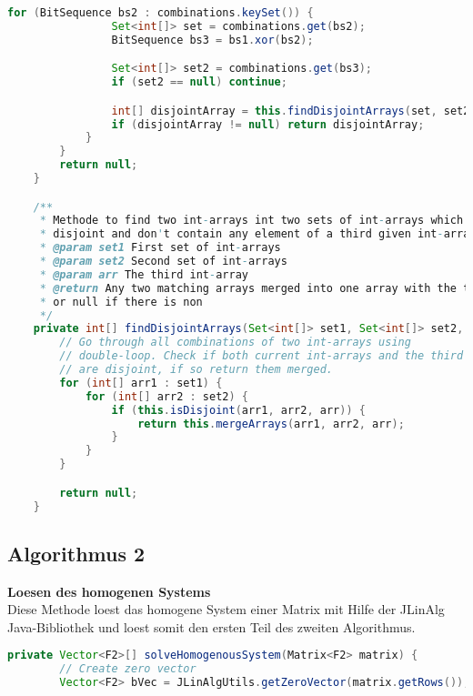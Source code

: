\documentclass[a4paper,10pt,ngerman]{scrartcl}
\begin{document}
{\begin{lstlisting}[language=Java]
            for (BitSequence bs2 : combinations.keySet()) {
                Set<int[]> set = combinations.get(bs2);
                BitSequence bs3 = bs1.xor(bs2);

                Set<int[]> set2 = combinations.get(bs3);
                if (set2 == null) continue;

                int[] disjointArray = this.findDisjointArrays(set, set2, arrI);
                if (disjointArray != null) return disjointArray;
            }
        }
        return null;
    }

    /**
     * Methode to find two int-arrays int two sets of int-arrays which are
     * disjoint and don't contain any element of a third given int-array
     * @param set1 First set of int-arrays
     * @param set2 Second set of int-arrays
     * @param arr The third int-array
     * @return Any two matching arrays merged into one array with the third one,
     * or null if there is non
     */
    private int[] findDisjointArrays(Set<int[]> set1, Set<int[]> set2, int[] arr) {
        // Go through all combinations of two int-arrays using
        // double-loop. Check if both current int-arrays and the third array
        // are disjoint, if so return them merged.
        for (int[] arr1 : set1) {
            for (int[] arr2 : set2) {
                if (this.isDisjoint(arr1, arr2, arr)) {
                    return this.mergeArrays(arr1, arr2, arr);
                }
            }
        }

        return null;
    }
\end{lstlisting}

\subsection{Algorithmus 2}
\textbf{Loesen des homogenen Systems} \\
Diese Methode loest das homogene System einer Matrix mit Hilfe der JLinAlg Java-Bibliothek und loest somit den ersten Teil des zweiten Algorithmus. \\
\begin{lstlisting}[language=Java]
    private Vector<F2>[] solveHomogenousSystem(Matrix<F2> matrix) {
        // Create zero vector
        Vector<F2> bVec = JLinAlgUtils.getZeroVector(matrix.getRows());


\end{lstlisting}}
\end{document}
